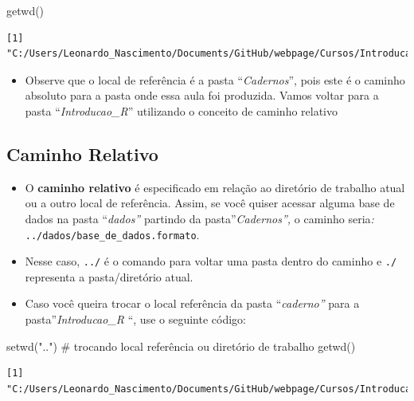 \documentclass[
  letterpaper,
  DIV=11,
  numbers=noendperiod]{scrartcl}
\newenvironment{Shaded}{\begin{snugshade}}{\end{snugshade}}
\newcommand{\CommentTok}[1]{\textcolor[rgb]{0.37,0.37,0.37}{#1}}
\newcommand{\FunctionTok}[1]{\textcolor[rgb]{0.28,0.35,0.67}{#1}}
\newcommand{\NormalTok}[1]{\textcolor[rgb]{0.00,0.23,0.31}{#1}}
\newcommand{\StringTok}[1]{\textcolor[rgb]{0.13,0.47,0.30}{#1}}
\providecommand{\tightlist}{%
  \setlength{\itemsep}{0pt}\setlength{\parskip}{0pt}}\usepackage{longtable,booktabs,array}
\begin{document}
\begin{Shaded}
\begin{Highlighting}[]
\FunctionTok{getwd}\NormalTok{()}
\end{Highlighting}
\end{Shaded}

\begin{verbatim}
[1] "C:/Users/Leonardo_Nascimento/Documents/GitHub/webpage/Cursos/Introducao_R/Cadernos"
\end{verbatim}

\begin{itemize}
\tightlist
\item
  Observe que o local de referência é a pasta ``\emph{Cadernos}'', pois
  este é o caminho absoluto para a pasta onde essa aula foi produzida.
  Vamos voltar para a pasta ``\emph{Introducao\_R}'' utilizando o
  conceito de caminho relativo
\end{itemize}

\subsection{Caminho Relativo}\label{caminho-relativo}

\begin{itemize}
\item
  O \textbf{caminho relativo} é especificado em relação ao diretório de
  trabalho atual ou a outro local de referência. Assim, se você quiser
  acessar alguma base de dados na pasta ``\emph{dados''} partindo da
  pasta''\emph{Cadernos'',} o caminho seria\emph{:}
  \texttt{../dados/base\_de\_dados.formato}.
\item
  Nesse caso, \texttt{../} é o comando para voltar uma pasta dentro do
  caminho e \texttt{./} representa a pasta/diretório atual.
\item
  Caso você queira trocar o local referência da pasta ``\emph{caderno''}
  para a pasta''\emph{Introducao\_R} ``, use o seguinte código:
\end{itemize}

\begin{Shaded}
\begin{Highlighting}[]
\FunctionTok{setwd}\NormalTok{(}\StringTok{".."}\NormalTok{) }\CommentTok{\# trocando local referência ou diretório de trabalho}
\FunctionTok{getwd}\NormalTok{()}
\end{Highlighting}
\end{Shaded}

\begin{verbatim}
[1] "C:/Users/Leonardo_Nascimento/Documents/GitHub/webpage/Cursos/Introducao_R"
\end{verbatim}
\end{document}
